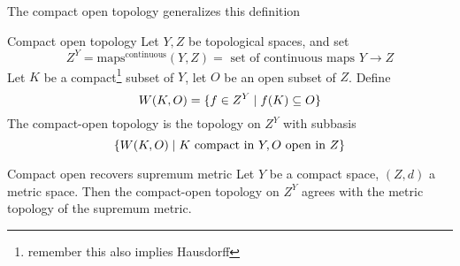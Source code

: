 \documentclass[language=english]{TemplateLecture}
\begin{document}
The compact open topology generalizes this definition

\begin{defi}{Compact open topology}{}
    Let \(Y,Z\) be topological spaces, and set
    \[Z^Y = \mathrm{maps}^{\mathrm{continuous}}(Y,Z) = \text{ set of continuous maps \(Y \to Z\)}\]
    Let \(K\) be a compact\footnote{remember this also implies Hausdorff} subset of \(Y\), let \(O\) be an open subset of \(Z\). Define
    \[W(K,O) = \{f \in Z^Y \mid f(K) \subseteq O\}\]
    The compact-open topology is the topology on \(Z^Y\) with subbasis
    \[\{W(K,O) \mid K \text{ compact in } Y, O \text{ open in } Z\}\]
\end{defi}

\begin{thm}{Compact open recovers supremum metric}{}
    Let \(Y\) be a compact space, \((Z,d)\) a metric space. Then the compact-open topology on \(Z^Y\) agrees with the metric topology of the supremum metric.
\end{thm}
\end{document}
